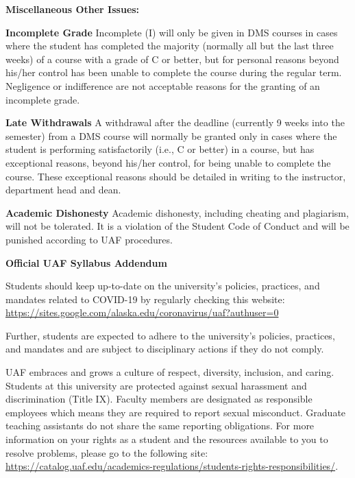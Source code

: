 \documentclass[12pt]{article}
\begin{document}


\textbf{Miscellaneous Other Issues:}

\textbf{Incomplete Grade} 
Incomplete (I) will only be given in DMS courses in cases where the student has completed the majority (normally all but the last three weeks) of a course with a grade of C or better, but for personal reasons beyond his/her control has been unable to complete the course during the regular term. Negligence or indifference are not acceptable reasons for the granting of an incomplete grade. 

\textbf{Late Withdrawals} 
A withdrawal after the deadline (currently 9 weeks into the semester) from a DMS course will normally be granted only in cases where the student is performing satisfactorily (i.e., C or better) in a course, but has exceptional reasons, beyond his/her control, for being unable to complete the course. These exceptional reasons should be detailed in writing to the instructor, department head and dean.


\textbf{Academic Dishonesty}
Academic dishonesty, including cheating and plagiarism, will not
be tolerated.  It is a violation of the Student Code of Conduct
and will be punished according to UAF procedures.


\textbf{\large{Official UAF Syllabus Addendum}}
 
\hfill

 Students should keep up-to-date on the university's policies, practices, and mandates related to COVID-19 by regularly checking this website: \url{https://sites.google.com/alaska.edu/coronavirus/uaf?authuser=0}

Further, students are expected to adhere to the university's policies, practices, and mandates and are subject to disciplinary actions if they do not comply.

 UAF embraces and grows a culture of respect, diversity, inclusion, and caring. Students at this university are protected against sexual harassment and discrimination (Title IX). Faculty members are designated as responsible employees which means they are required to report sexual misconduct. Graduate teaching assistants do not share the same reporting obligations. For more information on your rights as a student and the resources available to you to resolve problems, please go to the following site: \url{https://catalog.uaf.edu/academics-regulations/students-rights-responsibilities/}.
\end{document}
